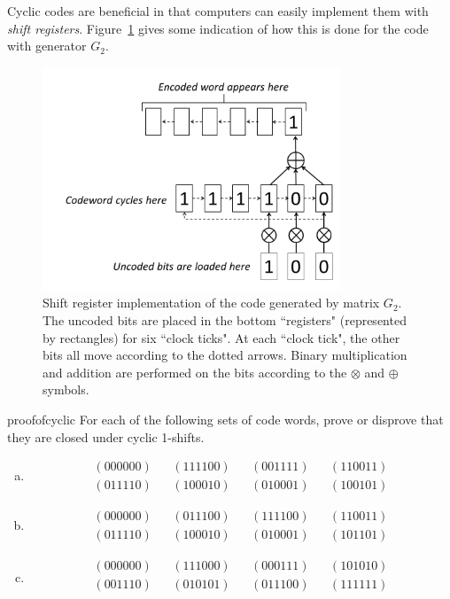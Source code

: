 Cyclic codes are beneficial in that computers can easily implement them with \emph{shift registers}. Figure~\ref{fig:shift} gives some indication of how this is done for the code with generator $G_2$.
\begin{figure}[h]
\begin{center}
\includegraphics[width=3.5in]{images/ShiftRegister.png}
\end{center}
\caption{\label{fig:shift}Shift register implementation of the code generated by matrix $G_2$. The uncoded bits are placed in the bottom ``registers" (represented by rectangles) for six ``clock ticks". At each ``clock tick", the other bits all move according to the dotted arrows. Binary multiplication and addition are performed on the bits according to the $\otimes$ and $\oplus$ symbols. }
\end{figure}

\begin{exercise}{proofofcyclic}
For each of the following sets of code words, prove or disprove that they are closed under cyclic 1-shifts.  
\begin{enumerate}[(a)]
\item
\[\begin{array}{ccccccc}
(000000) & & (111100) & & (001111) & & (110011)\\
(011110) & & (100010) & & (010001) & & (100101)
\end{array}\]
\item
\[\begin{array}{ccccccc}
(000000) & & (011100) & & (111100) & & (110011) \\
(011110) & & (100010) & & (010001) & & (101101)
\end{array}\]
\item
\[\begin{array}{ccccccc}
(000000) & & (111000) & & (000111) & & (101010) \\
(001110) & & (010101) & &(011100) & & (111111) \\
\end{array}\]
\end {enumerate}
\end {exercise}

